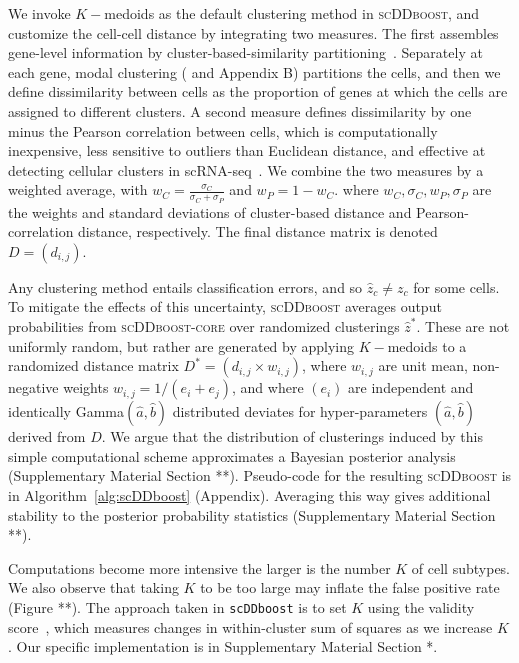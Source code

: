 \documentclass[aoas,preprint]{imsart}
\begin{document}
We invoke $K-$medoids \citep{kmedoids} 
as the default clustering method in \textsc{scDDboost}, and customize the cell-cell distance by integrating two measures.  
The first assembles gene-level information by cluster-based-similarity partitioning~\citep{ref:cspa}.
 Separately at each gene,   modal clustering (\cite{ref:dahl} and Appendix B) partitions the cells, and
then we define dissimilarity between cells as the proportion of genes at which the cells are assigned to different clusters. 
A second measure defines dissimilarity by one minus the 
Pearson correlation between cells, which is computationally inexpensive,
less sensitive to outliers than Euclidean distance, and effective at detecting cellular clusters in 
scRNA-seq~\citep{Cor}.
 We combine the two measures by a weighted average, 
with  $w_C = \frac{\sigma_C}{\sigma_C + \sigma_P}$ and $w_P = 1 - w_C$. where $w_C,\sigma_C, w_P, \sigma_P$ are the weights and standard deviations of cluster-based distance and Pearson-correlation distance, respectively.
The final distance matrix is denoted $D=\left( d_{i,j} \right)$. 

Any clustering method  entails classification errors, and so $\hat z_c \neq z_c$ for some cells. To mitigate
the effects of this uncertainty, \textsc{scDDboost} averages output probabilities from \textsc{scDDboost-core} over
randomized clusterings $\hat z^*$.  These are not uniformly random, but rather are generated by applying $K-$medoids
to a randomized distance matrix $D^*=\left( d_{i,j}\times w_{i,j}\right)$, 
where $w_{i,j}$ are  unit mean, non-negative weights
$w_{i,j} = 1/( e_i + e_j )$, and where $( e_i) $ are independent and identically Gamma$(\hat a, \hat b)$ distributed
deviates for hyper-parameters $(\hat a, \hat b)$ derived from $D$.   We argue that the distribution of
clusterings induced by this simple computational 
scheme approximates a Bayesian posterior analysis (Supplementary Material
Section **).   Pseudo-code for the resulting \textsc{scDDboost} is in Algorithm~\ref{alg:scDDboost} (Appendix).
Averaging this way gives additional stability to the posterior probability statistics (Supplementary Material
Section **).


Computations become more intensive the larger is the number $K$ of cell subtypes. We also observe 
that  taking $K$ to be too large may inflate the false positive rate (Figure **).  The approach
taken in \verb+scDDboost+ is to set $K$ using the validity score~\citep{selK}, which measures 
changes in within-cluster sum of squares as we increase $K$.  Our specific implementation is in
Supplementary Material Section *.
\end{document}
